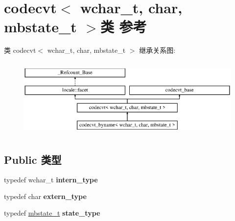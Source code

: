 \hypertarget{classcodecvt_3_01wchar__t_00_01char_00_01mbstate__t_01_4}{}\section{codecvt$<$ wchar\+\_\+t, char, mbstate\+\_\+t $>$类 参考}
\label{classcodecvt_3_01wchar__t_00_01char_00_01mbstate__t_01_4}
类 codecvt$<$ wchar\+\_\+t, char, mbstate\+\_\+t $>$ 继承关系图\+:\begin{figure}[H]
\begin{center}
\leavevmode
\includegraphics[height=3.985765cm]{classcodecvt_3_01wchar__t_00_01char_00_01mbstate__t_01_4}
\end{center}
\end{figure}
\subsection*{Public 类型}
\begin{DoxyCompactItemize}
\item 
\mbox{\label{classcodecvt_3_01wchar__t_00_01char_00_01mbstate__t_01_4_a655b7d372757accc543da0e50023ee07}} 
typedef wchar\+\_\+t {\bfseries intern\+\_\+type}
\item 
\mbox{\label{classcodecvt_3_01wchar__t_00_01char_00_01mbstate__t_01_4_a6337d457ea6e9792a1f135f0bc4a8dbf}} 
typedef char {\bfseries extern\+\_\+type}
\item 
\mbox{\label{classcodecvt_3_01wchar__t_00_01char_00_01mbstate__t_01_4_aa3ed2cd07d7969c49c54e83ce1cf1f12}} 
typedef \hyperlink{struct____mbstate__t}{mbstate\+\_\+t} {\bfseries state\+\_\+type}
\end{DoxyCompactItemize}
